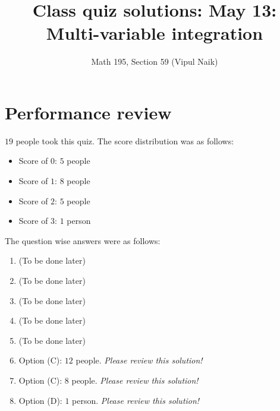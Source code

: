 \documentclass[10pt]{amsart}
\title{Class quiz solutions: May 13: Multi-variable integration}
\author{Math 195, Section 59 (Vipul Naik)}
\begin{document}
\maketitle

\section{Performance review}

$19$ people took this quiz. The score distribution was as follows:

\begin{itemize}
\item Score of $0$: $5$ people
\item Score of $1$: $8$ people
\item Score of $2$: $5$ people
\item Score of $3$: $1$ person
\end{itemize}

The question wise answers were as follows:

\begin{enumerate}
\item (To be done later)
\item (To be done later)
\item (To be done later)
\item (To be done later)
\item (To be done later)
\item Option (C): $12$ people. {\em Please review this solution!}
\item Option (C): $8$ people. {\em Please review this solution!}
\item Option (D): $1$ person. {\em Please review this solution!}
\end{enumerate}
\end{document}
